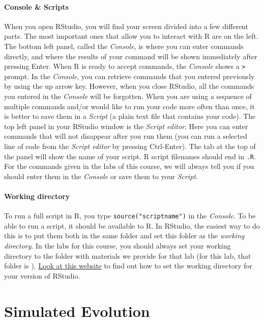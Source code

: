 \documentclass[a4paper, 9pt]{article}
\begin{document}
\paragraph{Console \& Scripts}
When you open RStudio, you will find your screen divided into a few different parts. The most important ones that allow you to interact with R are on the left. The bottom left panel, called the \emph{Console}, is where you can enter commands directly, and where the results of your command will be shown immediately after pressing Enter. When R is ready to accept commands, the \emph{Console} shows a \texttt{>} prompt. In the \emph{Console}, you can retrieve commands that you entered previously by using the up arrow key. However, when you close RStudio, all the commands you entered in the \emph{Console} will be forgotten. When you are using a sequence of multiple commands and/or would like to run your code more often than once, it is better to save them in a \emph{Script} (a plain text file that contains your code). The top left panel in your RStudio window is the \emph{Script editor}.  Here you can enter commands that will not disappear after you run them (you can run a selected line of code from the \emph{Script editor} by pressing Ctrl-Enter). The tab at the top of the panel will show the name of your script. R script filenames should end in \texttt{.R}. For the commands given in the labs of this course, we will always tell you if you should enter them in the \emph{Console} or save them to your \emph{Script}.

\paragraph{Working directory} 
     To run a full script in R, you type \verb|source("scriptname")| in the \emph{Console}. To be able to run a script, it should be available to R. In RStudio, the easiest way to do this is to put them both in the same folder and set this folder as the \emph{working directory}. In the labs for this course, you should always set your working directory to the folder with materials we provide for that lab (for this lab, that folder is ). \href{https://support.rstudio.com/hc/en-us/articles/200711843-Working-Directories-and-Workspaces}{Look at this website} to find out how to set the working directory for your version of RStudio.

\section{Simulated Evolution}\label{simulated-evolution}
\end{document}
